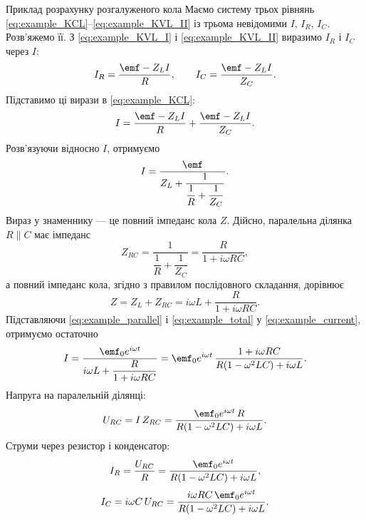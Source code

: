 \begin{Example}{Приклад розрахунку розгалуженого кола}
Маємо систему трьох рівнянь \eqref{eq:example_KCL}--\eqref{eq:example_KVL_II} із трьома невідомими $I$, $I_R$, $I_C$. Розв'яжемо її. З \eqref{eq:example_KVL_I} і \eqref{eq:example_KVL_II} виразимо $I_R$ і $I_C$ через $I$:
\begin{equation*}
	I_R = \frac{\emf - Z_L I}{R}, \qquad
	I_C = \frac{\emf - Z_L I}{Z_C}.
\end{equation*}
Підставимо ці вирази в \eqref{eq:example_KCL}:
\begin{equation*}
	I = \frac{\emf - Z_L I}{R} + \frac{\emf - Z_L I}{Z_C}.
\end{equation*}
Розв'язуючи відносно $I$, отримуємо
\begin{equation}\label{eq:example_current}
	I = \frac{\emf}{Z_L + \dfrac{1}{\dfrac{1}{R} + \dfrac{1}{Z_C}}}.
\end{equation}
Вираз у знаменнику --- це повний імпеданс кола $Z$. Дійсно, паралельна ділянка $R \parallel C$ має імпеданс
\begin{equation}\label{eq:example_parallel}
	Z_{RC} = \frac{1}{\dfrac{1}{R} + \dfrac{1}{Z_C}} = \frac{R}{1 + i\omega RC},
\end{equation}
а повний імпеданс кола, згідно з правилом послідовного складання, дорівнює
\begin{equation}\label{eq:example_total}
	Z = Z_L + Z_{RC} = i\omega L + \frac{R}{1 + i\omega RC}.
\end{equation}
Підставляючи \eqref{eq:example_parallel} і \eqref{eq:example_total} у \eqref{eq:example_current}, отримуємо остаточно
\begin{equation}\label{eq:example_current_explicit}
	I = \frac{\emf_0 e^{i\omega t}}{i\omega L + \dfrac{R}{1 + i\omega RC}}
	  = \emf_0 e^{i\omega t}\,\frac{1 + i\omega RC}{R(1 - \omega^2 LC) + i\omega L}.
\end{equation}
Напруга на паралельній ділянці:
\begin{equation*}
	U_{RC} = I\,Z_{RC}
	       = \frac{\emf_0 e^{i\omega t}\,R}{R(1 - \omega^2 LC) + i\omega L}.
\end{equation*}
Струми через резистор і конденсатор:
\begin{equation*}
	I_R = \frac{U_{RC}}{R} = \frac{\emf_0 e^{i\omega t}}{R(1 - \omega^2 LC) + i\omega L},
\end{equation*}
\begin{equation*}
	I_C = i\omega C\,U_{RC} = \frac{i\omega RC\,\emf_0 e^{i\omega t}}{R(1 - \omega^2 LC) + i\omega L}.
\end{equation*}


\end{Example}
